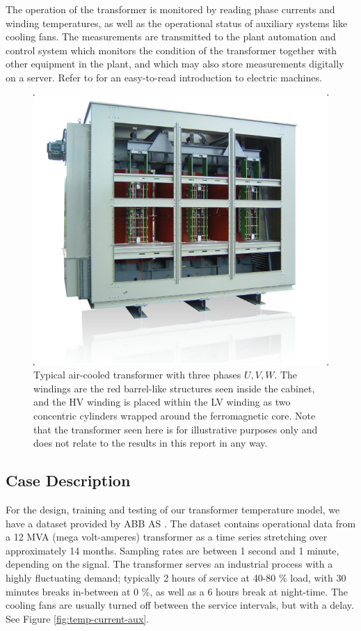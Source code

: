 \documentclass[]{article}
\begin{document}
The operation of the transformer is monitored by reading phase currents and winding temperatures, as well as the operational status of auxiliary systems like cooling fans. The measurements are transmitted to the plant automation and control system which monitors the condition of the transformer together with other equipment in the plant, and which may also store measurements digitally on a server. Refer to \cite{hubert2002} for an easy-to-read introduction to electric machines.

\begin{figure}[!h]
	\centering
	\includegraphics[width=1\linewidth]{./figs/dry-transformer.png}
	\caption{Typical air-cooled transformer with three phases $U, V, W$. The windings are the red barrel-like structures seen inside the cabinet, and the HV winding is placed within the LV winding as two concentric cylinders wrapped around the ferromagnetic core. Note that the transformer seen here is for illustrative purposes only and does not relate to the results in this report in any way.}
	\label{fig:dry-transformer}
\end{figure}

\subsection{Case Description} \label{sec:case-description}
For the design, training and testing of our transformer temperature model, we have a dataset provided by ABB AS \cite{abb-url}. The dataset contains operational data from a 12 MVA (mega volt-amperes) transformer as a time series stretching over approximately 14 months. Sampling rates are between 1 second and 1 minute, depending on the signal. The transformer serves an industrial process with a highly fluctuating demand; typically 2 hours of service at 40-80 \% load, with 30 minutes breaks in-between at 0 \%, as well as a 6 hours break at night-time. The cooling fans are usually turned off between the service intervals, but with a delay. See Figure \ref{fig:temp-current-aux}.
\end{document}
